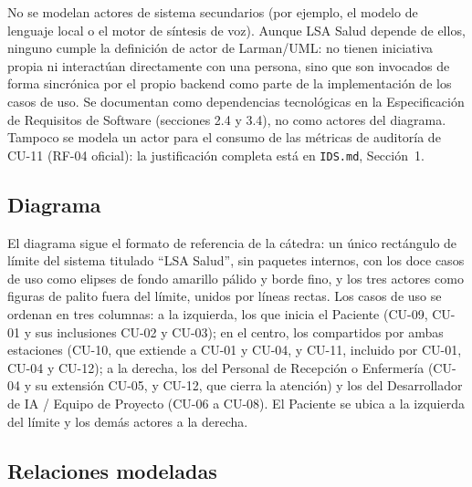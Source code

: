 No se modelan actores de sistema secundarios (por ejemplo, el modelo de
lenguaje local o el motor de síntesis de voz). Aunque LSA Salud depende de
ellos, ninguno cumple la definición de actor de Larman/UML: no tienen
iniciativa propia ni interactúan directamente con una persona, sino que son
invocados de forma sincrónica por el propio backend como parte de la
implementación de los casos de uso. Se documentan como dependencias
tecnológicas en la Especificación de Requisitos de Software (secciones 2.4
y 3.4), no como actores del diagrama. Tampoco se modela un actor para el
consumo de las métricas de auditoría de CU-11 (RF-04 oficial): la
justificación completa está en \texttt{IDS.md}, Sección~1.

\subsection{Diagrama}

El diagrama sigue el formato de referencia de la cátedra: un único
rectángulo de límite del sistema titulado ``LSA Salud'', sin paquetes
internos, con los doce casos de uso como elipses de fondo amarillo pálido y
borde fino, y los tres actores como figuras de palito fuera del límite,
unidos por líneas rectas. Los casos de uso se ordenan en tres columnas: a la
izquierda, los que inicia el Paciente (CU-09, CU-01 y sus inclusiones CU-02
y CU-03); en el centro, los compartidos por ambas estaciones (CU-10, que
extiende a CU-01 y CU-04, y CU-11, incluido por CU-01, CU-04 y CU-12); a la
derecha, los del Personal de Recepción o Enfermería (CU-04 y su extensión
CU-05, y CU-12, que cierra la atención) y los del Desarrollador de IA /
Equipo de Proyecto (CU-06 a CU-08). El Paciente se ubica a la izquierda del
límite y los demás actores a la derecha.


\subsection{Relaciones modeladas}

